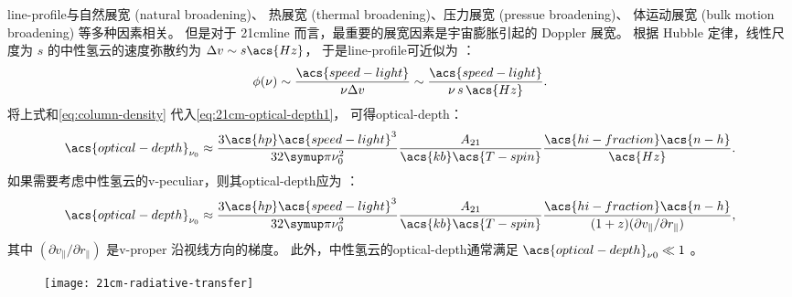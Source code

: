 \ac{line-profile}与自然展宽 (natural broadening)、
热展宽 (thermal broadening)、压力展宽 (pressue broadening)、
体运动展宽 (bulk motion broadening) 等多种因素相关。
但是对于 \ac{21cmline} 而言，最重要的展宽因素是宇宙膨胀引起的 Doppler 展宽。
根据 Hubble 定律，线性尺度为 $s$ 的中性氢云的速度弥散约为
$\Delta v \sim s \acs{Hz}$，
于是\ac{line-profile}可近似为 \cite{furlanetto2006,morales2010}：
\begin{equation}
  \phi(\nu) \sim \frac{\acs{speed-light}}{\nu \Delta v}
    \sim \frac{\acs{speed-light}}{\nu \, s \,\acs{Hz}} .
\end{equation}
将上式和\autoref{eq:column-density} 代入\autoref{eq:21cm-optical-depth1}，
可得\acl{optical-depth}：
\begin{equation}
  \label{eq:21cm-optical-depth2}
  \acs{optical-depth}_{\nu_0}
    \approx \frac{3 \acs{hp} \acs{speed-light}^3}{32\Cpi \nu_0^2}
      \frac{A_{21}}{\acs{kb} \acs{T-spin}}
      \frac{\acs{hi-fraction} \acs{n-h}}{\acs{Hz}} .
\end{equation}
如果需要考虑中性氢云的\ac{v-peculiar}，则其\acl{optical-depth}应为
\cite{bharadwaj2005,furlanetto2006,pritchard2012}：
\begin{equation}
  \label{eq:21cm-optical-depth3}
  \acs{optical-depth}_{\nu_0}
    \approx \frac{3 \acs{hp} \acs{speed-light}^3}{32\Cpi \nu_0^2}
      \frac{A_{21}}{\acs{kb} \acs{T-spin}}
      \frac{\acs{hi-fraction} \acs{n-h}}{
        (1+z) (\partial v_{\parallel} / \partial r_{\parallel})} ,
\end{equation}
其中 $(\partial v_{\parallel} / \partial r_{\parallel})$ 是\ac{v-proper}
沿视线方向的梯度。
此外，中性氢云的\acl{optical-depth}通常满足
$\acs{optical-depth}_{\nu0} \ll 1$
\cite{madau1997,furlanetto2006,pritchard2010mn}。

\begin{figure}[htp]
  \centering
  \texttt{[image: 21cm-radiative-transfer]}
  \label{fig:21cm-cmb-rt}
\end{figure}

